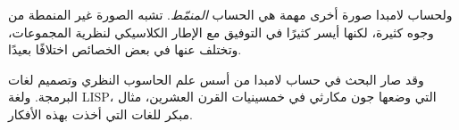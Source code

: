 \documentclass[../../../include/open-logic-section]{subfiles}
\begin{document}
\begin{digress}
ولحساب لامبدا صورة أخرى مهمة هي الحساب \emph{المنمّط}.
تشبه الصورة غير المنمطة من وجوه كثيرة، لكنها أيسر كثيرًا في
التوفيق مع الإطار الكلاسيكي لنظرية المجموعات، وتختلف عنها في
بعض الخصائص اختلافًا بعيدًا.

وقد صار البحث في حساب لامبدا من أسس علم الحاسوب النظري وتصميم
لغات البرمجة. ولغة LISP، التي وضعها جون مكارثي في خمسينيات
القرن العشرين، مثال مبكر للغات التي أخذت بهذه الأفكار.
\end{digress}
\end{document}
